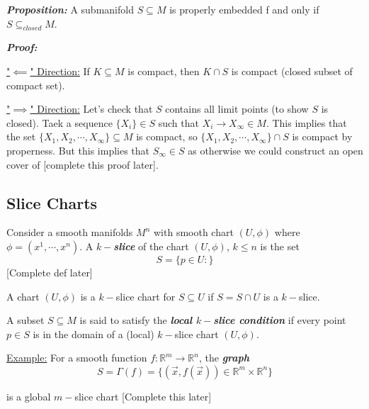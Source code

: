 \documentclass{article}
\newcommand{\R}{\mathbb{R}}
\begin{document}
\vskip 0.5cm
\begin{dottedbox}
  \emph{\textbf{Proposition:}} A submanifold $S \subseteq M$ is properly embedded f and only if $S \subseteq_{closed} M$.
\end{dottedbox}

\vskip 0.5cm
\emph{\textbf{Proof:}}

\vskip 0.5cm
\underline{"$\impliedby$" Direction:} If $K \subseteq M$ is compact, then $K \cap S$ is compact (closed subset of compact set).

\vskip 0.5cm
\underline{"$\implies$" Direction:} Let's check that $S$ contains all limit points (to show $S$ is closed). Taek a sequence $\{X_i\} \in S$ such that $X_i \rightarrow X_{\infty} \in M$. This implies that the set $\{X_1, X_2, \cdots, X_{\infty} \} \subseteq M$ is compact, so $\{X_1, X_2, \cdots, X_{\infty} \} \cap S $ is compact by properness. But this implies that $S_{\infty} \in S$ as otherwise we could construct an open cover of [complete this proof later].

\vskip 1cm
\subsection{Slice Charts}

\begin{mathdefinitionbox}{}
  Consider a smooth manifolds $M^n$ with smooth chart $(U, \phi)$ where $\phi = (x^1, \cdots, x^n)$. A \textbf{\emph{$k-$slice}} of the chart $(U, \phi)$, $k \leq n$ is the set 
  \[ S = \{ p \in U :  \} \]
  [Complete def later]
\end{mathdefinitionbox}

\vskip 0.5cm
\begin{mathdefinitionbox}{}
  A chart $(U, \phi)$ is a $k-$slice chart for $S \subseteq U$ if $S = S \cap U$ is a $k-$slice.
\end{mathdefinitionbox}

\vskip 0.5cm
\begin{mathdefinitionbox}{}
  A subset $S \subseteq M$ is said to satisfy the \emph{\textbf{local $k-$slice condition}} if every point $p \in S$ is in the domain of a (local) $k-$slice chart $(U, \phi)$.
\end{mathdefinitionbox}

\vskip 0.5cm
\underline{Example:} For a smooth function $f : \R^m \rightarrow \R^n$, the \emph{\textbf{graph}} 
\[ S = \Gamma(f) = \{ (\vec{x}, f(\vec{x})) \in \R^m \times \R^n \} \]

is a global $m-$slice chart [Complete this later]
\end{document}
